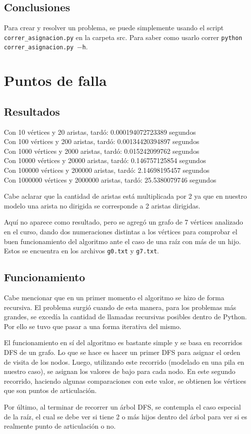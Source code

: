 \documentclass[a4paper,10pt]{article}
\begin{document}
\subsection{Conclusiones}
	Para crear y resolver un problema, se puede simplemente usando el script \texttt{correr\_asignacion.py} en la carpeta src. Para saber como usarlo correr \texttt{python correr\_asignacion.py $-$h}.

\section{Puntos de falla}
\subsection{Resultados}
	\noindent Con 10 vértices y 20 aristas, tardó: 0.000194072723389 segundos \\
	Con 100 vértices y 200 aristas, tardó: 0.00134420394897 segundos \\
	Con 1000 vértices y 2000 aristas, tardó: 0.015242099762 segundos \\
	Con 10000 vértices y 20000 aristas, tardó: 0.146757125854 segundos \\
	Con 100000 vértices y 200000 aristas, tardó: 2.14698195457 segundos \\
	Con 1000000 vértices y 2000000 aristas, tardó: 25.5380079746 segundos \\
	\par Cabe aclarar que la cantidad de aristas está multiplicada por 2 ya que en nuestro modelo una arista no dirigida se corresponde a 2 aristas dirigidas.
	\par Aquí no aparece como resultado, pero se agregó un grafo de 7 vértices analizado en el curso, dando dos numeraciones distintas a los vértices para comprobar el buen funcionamiento del algoritmo ante el caso de una raíz con más de un hijo. Estos se encuentra en los archivos \texttt{g0.txt} y \texttt{g7.txt}.
\subsection{Funcionamiento}
	Cabe mencionar que en un primer momento el algoritmo se hizo de forma recursiva. El problema surgió cuando de esta manera, para los problemas más grandes, se excedía la cantidad de llamadas recursivas posibles dentro de Python. Por ello se tuvo que pasar a una forma iterativa del mismo.
	\par El funcionamiento en sí del algoritmo es bastante simple y se basa en recorridos DFS de un grafo. Lo que se hace es hacer un primer DFS para asignar el orden de visita de los nodos. Luego, utilizando este recorrido (modelado en una pila en nuestro caso), se asignan los valores de bajo para cada nodo. En este segundo recorrido, haciendo algunas comparaciones con este valor, se obtienen los vértices que son puntos de articulación.
	\par Por último, al terminar de recorrer un árbol DFS, se contempla el caso especial de la raíz, el cual se debe ver si tiene 2 o más hijos dentro del árbol para ver si es realmente punto de articulación o no.
\end{document}
